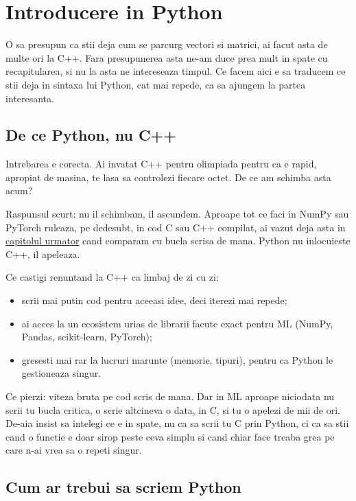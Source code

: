 \chapter{Introducere in Python}
\label{chapter:python-intro}

O sa presupun ca stii deja cum se parcurg vectori si matrici, ai facut
asta de multe ori la C++. Fara presupunerea asta ne-am duce prea mult in
spate cu recapitularea, si nu la asta ne intereseaza timpul. Ce facem aici
e sa traducem ce stii deja in sintaxa lui Python, cat mai repede, ca sa
ajungem la partea interesanta.

\section{De ce Python, nu C++}

Intrebarea e corecta. Ai invatat C++ pentru olimpiada pentru ca e rapid,
apropiat de masina, te lasa sa controlezi fiecare octet. De ce am schimba
asta acum?

Raspunsul scurt: nu il schimbam, il ascundem. Aproape tot ce faci in
NumPy sau PyTorch ruleaza, pe dedesubt, in cod C sau C++ compilat, ai
vazut deja asta in \hyperref[chapter:numpy-pandas]{capitolul urmator}
cand comparam  cu bucla scrisa de mana. Python nu
inlocuieste C++, il apeleaza.

Ce castigi renuntand la C++ ca limbaj de zi cu zi:

\begin{itemize}
  \item scrii mai putin cod pentru aceeasi idee, deci iterezi mai repede;
  \item ai acces la un ecosistem urias de librarii facute exact pentru
    ML (NumPy, Pandas, scikit-learn, PyTorch);
  \item gresesti mai rar la lucruri marunte (memorie, tipuri), pentru ca
    Python le gestioneaza singur.
\end{itemize}

Ce pierzi: viteza bruta pe cod scris de mana. Dar in ML aproape niciodata
nu scrii tu bucla critica, o scrie altcineva o data, in C, si tu o apelezi
de mii de ori. De-aia insist sa intelegi ce e in spate, nu ca sa scrii tu
C prin Python, ci ca sa stii cand o functie e doar sirop peste ceva
simplu si cand chiar face treaba grea pe care n-ai vrea sa o repeti
singur.

\section{Cum ar trebui sa scriem Python}

